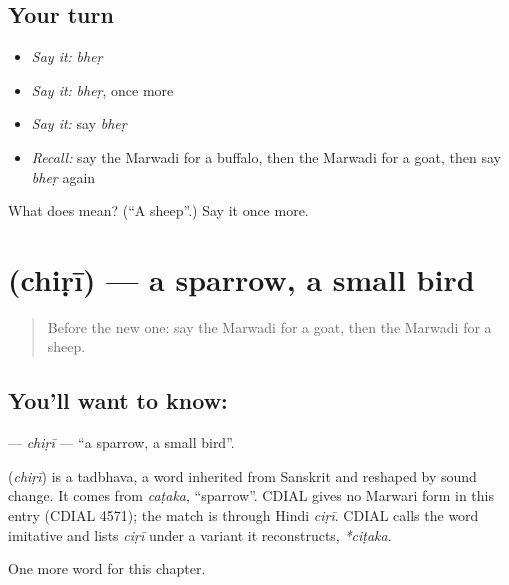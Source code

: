 \subsection*{Your turn}
\begin{itemize}
\raggedright
  \item \emph{Say it:} \emph{bheṛ}
  \item \emph{Say it:} \emph{bheṛ}, once more
  \item \emph{Say it:} say \emph{bheṛ}
  \item \emph{Recall:} say the Marwadi for a buffalo, then the Marwadi for a goat, then say \emph{bheṛ} again
\end{itemize}

\begin{tcolorbox}[breakable,colback=teal!4,colframe=teal!35!black,title={Before you move on}]
What does  mean? (\textquotedblleft{}A sheep\textquotedblright{}.) Say it once more.
\end{tcolorbox}
\section[\texorpdfstring{\mw{चिड़ी} (chiṛī)}{चिड़ी (chiṛī)}]{ (chiṛī) — a sparrow, a small bird}

\label{lesson:MW-C71-chiri}



\begin{quote}
Before the new one: say the Marwadi for a goat, then the Marwadi for a sheep.
\end{quote}

\subsection*{You'll want to know: }
\textbf{} — \emph{chiṛī} — \textquotedblleft{}a sparrow, a small bird\textquotedblright{}.

\begin{cousinweb}
\textbf{} (\emph{chiṛī}) is a tadbhava, a word inherited from Sanskrit and reshaped by sound change. It comes from \emph{caṭaka}, \textquotedblleft{}sparrow\textquotedblright{}. CDIAL gives no Marwari form in this entry (CDIAL 4571); the match is through Hindi \emph{ciṛī}. CDIAL calls the word imitative and lists \emph{ciṛī} under a variant it reconstructs, \emph{*ciṭaka}.
\end{cousinweb}

\begin{grammarlens}[title={What you've built}]
One more word for this chapter.
\end{grammarlens}

